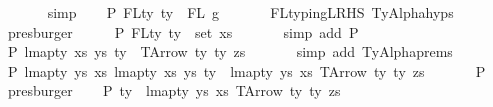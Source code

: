 \begin{isabellebody}
\ \ \ \ \ \isamarkupfalse%
\ simp\isanewline
\isanewline
\isanewline
\ \ \isamarkupfalse%
\ P{}{}{\isacharcolon}{\kern0pt}\ {\isachardoublequoteopen}FLty\ ty{\isacharprime}{\kern0pt}\ {\isacharequal}{\kern0pt}\ FL\ g{\isachardoublequoteclose}\isanewline
\ \ \ \ \ \isamarkupfalse%
\ FL{\isacharunderscore}{\kern0pt}typing{\isacharunderscore}{\kern0pt}LRHS\ TyAlpha{\isachardot}{\kern0pt}hyps{\isacharparenleft}{\kern0pt}{}{\isacharparenright}{\kern0pt}\ \isamarkupfalse%
\ presburger\isanewline
\ \ \isamarkupfalse%
\ \isamarkupfalse%
\ P{}{}{\isacharcolon}{\kern0pt}\ {\isachardoublequoteopen}FLty\ ty{\isacharprime}{\kern0pt}\ {\isacharequal}{\kern0pt}\ set\ xs{\isacharprime}{\kern0pt}{\isachardoublequoteclose}\isanewline
\ \ \ \ \ \isamarkupfalse%
\ {\isacharparenleft}{\kern0pt}simp\ add{\isacharcolon}{\kern0pt}\ P{}{\isacharparenright}{\kern0pt}\isanewline
\isanewline
\ \ \isamarkupfalse%
\ P{}{}{\isacharcolon}{\kern0pt}\ {\isachardoublequoteopen}lmap{\isacharunderscore}{\kern0pt}ty\ xs{\isacharprime}{\kern0pt}\ ys{\isacharprime}{\kern0pt}\ ty{\isacharprime}{\kern0pt}\ {\isacharequal}{\kern0pt}\ TArrow\ ty{}\ ty{}\ zs{\isachardoublequoteclose}\isanewline
\ \ \ \ \ \isamarkupfalse%
\ {\isacharparenleft}{\kern0pt}simp\ add{\isacharcolon}{\kern0pt}\ TyAlpha{\isachardot}{\kern0pt}prems{\isacharparenleft}{\kern0pt}{}{\isacharparenright}{\kern0pt}{\isacharparenright}{\kern0pt}\isanewline
\ \ \isamarkupfalse%
\ P{}{}{\isacharcolon}{\kern0pt}\ {\isachardoublequoteopen}lmap{\isacharunderscore}{\kern0pt}ty\ ys{\isacharprime}{\kern0pt}\ xs{\isacharprime}{\kern0pt}\ {\isacharparenleft}{\kern0pt}lmap{\isacharunderscore}{\kern0pt}ty\ xs{\isacharprime}{\kern0pt}\ ys{\isacharprime}{\kern0pt}\ ty{\isacharprime}{\kern0pt}{\isacharparenright}{\kern0pt}\ {\isacharequal}{\kern0pt}\ lmap{\isacharunderscore}{\kern0pt}ty\ ys{\isacharprime}{\kern0pt}\ xs{\isacharprime}{\kern0pt}\ {\isacharparenleft}{\kern0pt}TArrow\ ty{}\ ty{}\ zs{\isacharparenright}{\kern0pt}{\isachardoublequoteclose}\isanewline
\ \ \ \ \ \isamarkupfalse%
\ P{}{}\ \isamarkupfalse%
\ presburger\isanewline
\ \ \isamarkupfalse%
\ P{}{}{\isacharcolon}{\kern0pt}\ {\isachardoublequoteopen}ty{\isacharprime}{\kern0pt}\ {\isacharequal}{\kern0pt}\ lmap{\isacharunderscore}{\kern0pt}ty\ ys{\isacharprime}{\kern0pt}\ xs{\isacharprime}{\kern0pt}\ {\isacharparenleft}{\kern0pt}TArrow\ ty{}\ ty{}\ zs{\isacharparenright}{\kern0pt}{\isachardoublequoteclose}\isanewline

\end{isabellebody}
